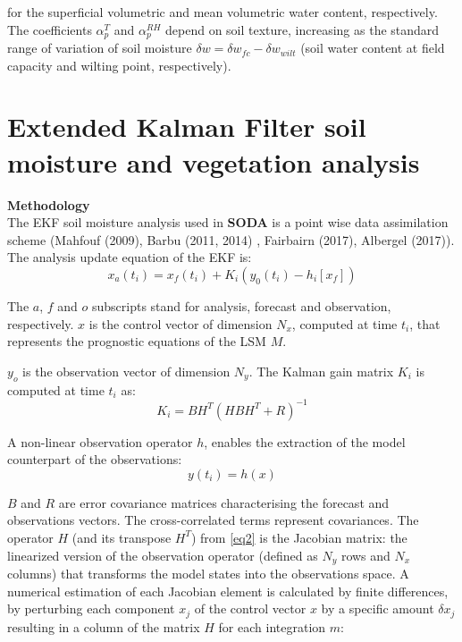 for the superficial volumetric and mean volumetric water content, respectively. The coefficients $\alpha_p^T$ and $\alpha_p^{RH}$ depend on soil texture, increasing as the standard range of variation of soil moisture $\delta w = \delta w_{fc} - \delta w_{wilt}$ (soil water content at field capacity and wilting point, respectively).

\section{Extended Kalman Filter soil moisture and vegetation analysis}
{\large {\bf Methodology}} \\
The EKF soil moisture analysis used in {\bf SODA} is a point wise data assimilation scheme (Mahfouf \etal (2009)\nocite{mahfouf_2009}, Barbu \etal (2011, 2014)\nocite{barbu_2011} \nocite{barbu_2014}, Fairbairn \etal (2017)\nocite{fairbairn_2017}, Albergel \etal (2017)\nocite{albergel_2017}). The analysis update equation of the EKF is: \\
\begin{equation}
x_a(t_i) = x_f(t_i)+K_i(y_0(t_i)-h_i[x_f])
\end{equation}

The $a$, $f$ and $o$ subscripts stand for analysis, forecast and observation, respectively. $x$ is the control vector of dimension $N_x$, computed at time $t_i$, that represents the prognostic equations of the LSM {\it $M$}.

$y_o$ is the observation vector of dimension $N_y$. The Kalman gain matrix $K_i$ is computed at time $t_i$ as: \\
\begin{equation} \label{eq2}
K_i = BH^T (HBH^T+R)^{-1}
\end{equation}

A non-linear observation operator $h$, enables the extraction of the model counterpart of the observations: \\
\begin{equation}
y(t_i) = h(x)
\end{equation}

$B$ and $R$ are error covariance matrices characterising the forecast and observations vectors. The cross-correlated terms represent covariances. The operator $H$ (and its transpose $H^T$) from \ref{eq2} is the Jacobian matrix: the linearized version of the observation operator (defined as $N_y$ rows and $N_x$ columns) that transforms the model states into the observations space. A numerical estimation of each Jacobian element is calculated by finite differences, by perturbing each component $x_j$ of the control vector $x$ by a specific amount $\delta x_j$ resulting in a column of the matrix $H$ for each integration $m$: 

